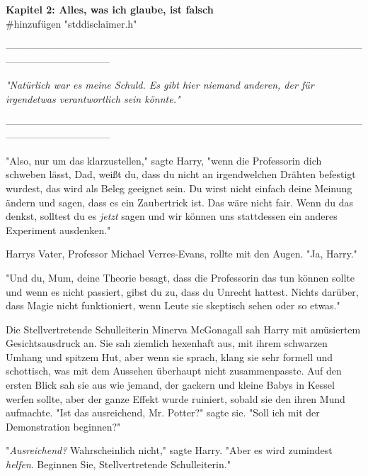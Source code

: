 

\hypertarget{alles-was-ich-glaube-ist-falsch}{%

\textbf{Kapitel 2: Alles, was ich glaube, ist falsch}\\

\#hinzufügen "stddisclaimer.h"

--------------------------------------------------------------------------------------------------------------------------------------------

\emph{"Natürlich war es meine Schuld. Es gibt hier niemand anderen, der für irgendetwas verantwortlich sein könnte."}

--------------------------------------------------------------------------------------------------------------------------------------------

"Also, nur um das klarzustellen," sagte Harry, "wenn die Professorin dich schweben lässt, Dad, weißt du, dass du nicht an irgendwelchen Drähten befestigt wurdest, das wird als Beleg geeignet sein. Du wirst nicht einfach deine Meinung ändern und sagen, dass es ein Zaubertrick ist. Das wäre nicht fair. Wenn du das denkst, solltest du es \emph{jetzt} sagen und wir können uns stattdessen ein anderes Experiment ausdenken."

Harrys Vater, Professor Michael Verres-Evans, rollte mit den Augen. "Ja, Harry."

"Und du, Mum, deine Theorie besagt, dass die Professorin das tun können sollte und wenn es nicht passiert, gibst du zu, dass du Unrecht hattest. Nichts darüber, dass Magie nicht funktioniert, wenn Leute sie skeptisch sehen oder so etwas."

Die Stellvertretende Schulleiterin Minerva McGonagall sah Harry mit amüsiertem Gesichtsausdruck an. Sie sah ziemlich hexenhaft aus, mit ihrem schwarzen Umhang und spitzem Hut, aber wenn sie sprach, klang sie sehr formell und schottisch, was mit dem Aussehen überhaupt nicht zusammenpasste. Auf den ersten Blick sah sie aus wie jemand, der gackern und kleine Babys in Kessel werfen sollte, aber der ganze Effekt wurde ruiniert, sobald sie den ihren Mund aufmachte. "Ist das ausreichend, Mr. Potter?" sagte sie. "Soll ich mit der Demonstration beginnen?"

"\emph{Ausreichend?} Wahrscheinlich nicht," sagte Harry. "Aber es wird zumindest \emph{helfen}. Beginnen Sie, Stellvertretende Schulleiterin."

}
